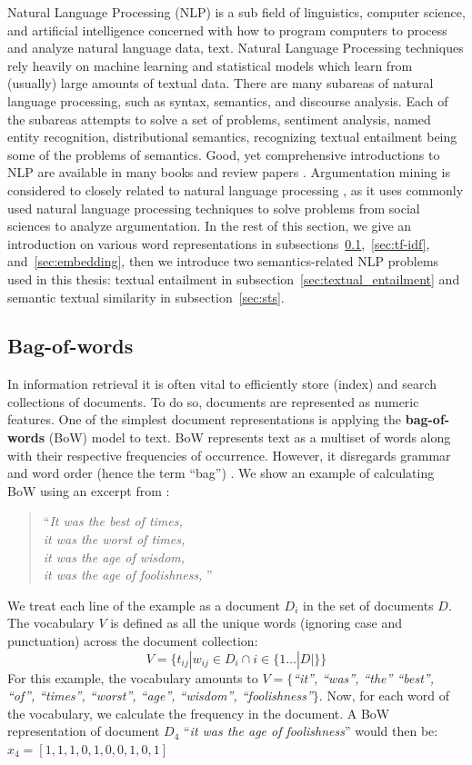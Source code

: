 Natural Language Processing (NLP) is a sub field of linguistics, computer
science, and artificial intelligence concerned with how to program computers to
process and analyze natural language data, text.  Natural Language Processing
techniques rely heavily on machine learning and statistical models which learn
from (usually) large amounts of textual data.  There are many subareas of
natural language processing, such as syntax, semantics, and discourse analysis.
Each of the subareas attempts to solve a set of problems, sentiment analysis, named
entity recognition, distributional semantics, recognizing textual entailment being
some of the problems of semantics. Good, yet comprehensive introductions to NLP are available 
in many books \citep{manning1999foundations} and review papers \citep{collobert2011natural}. 
Argumentation
mining is considered to closely related to natural language processing
\citep{lippi2015argument}, as it uses commonly used natural language processing
techniques to solve problems from social sciences to analyze argumentation.
In the rest of this section, we give an introduction on various word representations
in subsections~\ref{sec:bow},~\ref{sec:tf-idf}, and~\ref{sec:embedding}, 
then we introduce two 
semantics-related NLP problems used in this thesis: 
textual entailment in subsection~\ref{sec:textual_entailment}
and semantic textual similarity in subsection~\ref{sec:sts}.

\subsection{Bag-of-words}
\label{sec:bow}
In information retrieval it is often 
vital to efficiently 
store (index) and search collections of documents. 
To do so, documents are represented as numeric features. 
One of the simplest document representations is applying the 
\textbf{bag-of-words} (BoW) model to text. BoW represents text as a multiset of
words along with their respective frequencies of occurrence. However, it disregards
grammar and word order (hence the term ``bag'')
\citep{harris1954distributional}. 
We show an example of calculating BoW
using an excerpt from \citep{dickens1949tale}:
\begin{quote}
``\emph{It was the best of times, \\
it was the worst of times, \\
it was the age of wisdom, \\
it was the age of foolishness,
}''
\end{quote}
We treat each line of the example as a document $D_i$ in the set of documents
$D$. The vocabulary $V$ is 
defined as all the unique words (ignoring case and punctuation)
across the document collection:
$$
V = \{t_{ij} | w_{ij} \in D_i \cap i \in \{1 \dots |D|\} \}
$$
For this example, the vocabulary amounts to
$V = \{$\emph{``it'', ``was'', ``the'' ``best'', ``of'', ``times'', ``worst'', ``age'',
``wisdom'', ``foolishness''}$\}$.
Now, for each word of the vocabulary, we calculate the frequency in the document. 
A BoW representation of document $D_4$ 
``\emph{it was the age of foolishness}''
would then be: $x_4 = [1, 1, 1, 0, 1, 0, 0, 1, 0, 1]$

